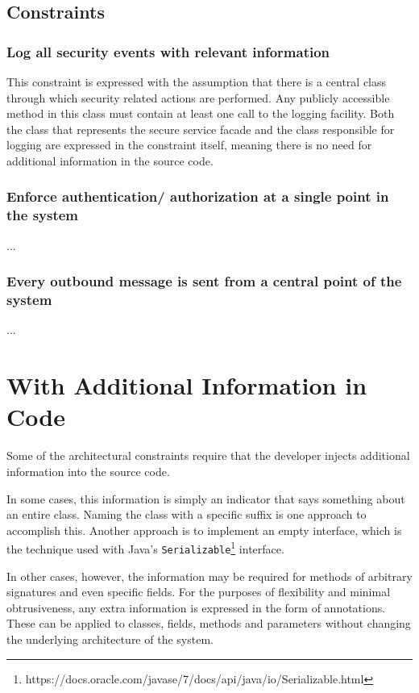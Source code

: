 \subsection{Constraints}

\subsubsection*{Log all security events with relevant information}
This constraint is expressed with the assumption that there is a central class through which security related actions are performed. Any publicly accessible method in this class must contain at least one call to the logging facility. Both the class that represents the secure service facade and the class responsible for logging are expressed in the constraint itself, meaning there is no need for additional information in the source code.

\subsubsection*{Enforce authentication/ authorization at a single point in the system}
...

\subsubsection*{Every outbound message is sent from a central point of the system}
...

\section{With Additional Information in Code}

Some of the architectural constraints require that the developer injects additional information into the source code.

In some cases, this information is simply an indicator that says something about an entire class. Naming the class with a specific suffix is one approach to accomplish this. Another approach is to implement an empty interface, which is the technique used with Java's \texttt{Serializable}\footnote{https://docs.oracle.com/javase/7/docs/api/java/io/Serializable.html} interface. 

In other cases, however, the information may be required for methods of arbitrary signatures and even specific fields. For the purposes of flexibility and minimal obtrusiveness, any extra information is expressed in the form of annotations. These can be applied to classes, fields, methods and parameters without changing the underlying architecture of the system.

